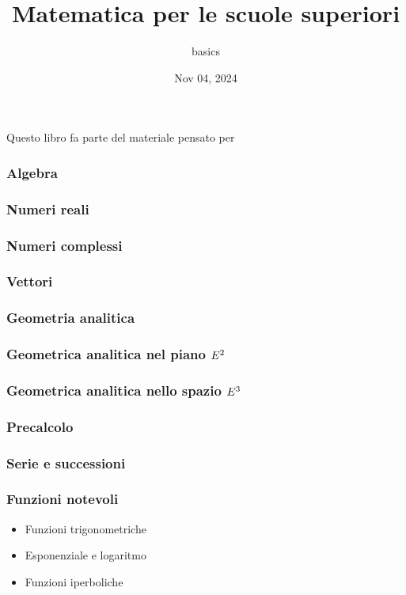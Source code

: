 \documentclass[letterpaper,10pt,english]{jupyterBook}
\title{Matematica per le scuole superiori}
\date{Nov 04, 2024}
\author{basics}
\begin{document}
\pagestyle{empty}
\sphinxmaketitle
\pagestyle{plain}
\sphinxtableofcontents
\pagestyle{normal}
\label{\detokenize{intro::doc}}


\sphinxAtStartPar
Questo libro fa parte del materiale pensato per 

\sphinxAtStartPar
{} 

\sphinxAtStartPar
{}
\subsubsection*{Algebra}


\subsubsection*{Numeri reali}
\subsubsection*{Numeri complessi}
\subsubsection*{Vettori}
\subsubsection*{Geometria analitica}


\subsubsection*{Geometrica analitica nel piano \protect\(E^2\protect\)}
\subsubsection*{Geometrica analitica nello spazio \protect\(E^3\protect\)}
\subsubsection*{Pre\sphinxhyphen{}calcolo}


\subsubsection*{Serie e successioni}
\subsubsection*{Funzioni notevoli}
\begin{itemize}
\item {} 
\sphinxAtStartPar
Funzioni trigonometriche

\item {} 
\sphinxAtStartPar
Esponenziale e logaritmo

\item {} 
\sphinxAtStartPar
Funzioni iperboliche

\end{itemize}
\end{document}
